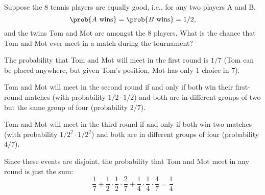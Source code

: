 \documentclass[handout]{mcs}
\begin{document}
\begin{problem}
\ppart Suppose the 8 tennis players are equally good, i.e.,
for any two players A and B,
\[
\prob{A \mbox{ wins}}=\prob{B \mbox{ wins}}= 1/2,
\]
and the twins Tom and Mot are amongst the 8 players.  What is the chance
that Tom and Mot ever meet in a match during the tournament?

\begin{solution}

The probability that Tom and Mot will meet in the first round is $1/7$
(Tom can be placed anywhere, but given Tom's position, Mot has only 1
choice in 7).

Tom and Mot will meet in the second round if and only if both win
their first-round matches (with probability $1/2 \cdot 1/2$) and both
are in different groups of two but the same group of four (probability
$2/7$).

Tom and Mot will meet in the third round if and only if both win two
matches (with probability $1/2^2 \cdot 1/2^2$) and both are in different
groups of four (probability $4/7$).

Since these events are disjoint, the probability that Tom and Mot meet in
any round is just the sum:
\[
\frac{1}{7} + \frac{1}{2} \cdot \frac{1}{2} \cdot \frac{2}{7}
+ \frac{1}{4} \cdot \frac{1}{4} \cdot \frac{4}{7} = \frac{1}{4}
\]
\end{solution}

\eparts

\end{problem}
\end{document}

